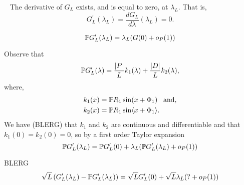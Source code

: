 \documentclass[journal]{IEEEtran}
\begin{document}
\begin{lemma}~\label{lem:diffatlambdaL}
The derivative of $G_L$ exists, and is equal to zero, at $\lambda_L$.  That is,
\[
G_L^\prime(\lambda_L) = \frac{d G_L}{d \lambda}(\lambda_L) = 0.
\]
\end{lemma}

\begin{lemma}\label{lem:GprimeLlambdaLconv}
\[
{\mathbb P} G^\prime_L(\lambda_L) = \lambda_L( G(0)  + o_P(1) )
\]
\end{lemma}
\begin{IEEEproof}
Observe that
\[
{\mathbb P} G^\prime_L(\lambda) = \frac{{\left| P \right|}}{L} k_1(\lambda) + \frac{{\left| D \right|}}{L} k_2(\lambda),
\]
where,
\begin{align*}
k_1(x) &= {\mathbb P} R_1 \sin(x + \Phi_1) \;\;\; \text{and}, \\
k_2(x) &=  {\mathbb P} R_1 \sin\langle x + \Phi_1 \rangle.
\end{align*}
We have (BLERG) that $k_1$ and $k_2$ are continuous and differentiable and that $k_1(0) = k_2(0) = 0$, so by a first order Taylor expansion
\[
{\mathbb P} G^\prime_L(\lambda_L) = {\mathbb P} G^\prime_L(0) + \lambda_L( {\mathbb P} G^\prime_L(\lambda_L)  + o_P(1) )
\]
\end{IEEEproof}

\begin{lemma}\label{lem:empiricprocc} BLERG
\[ 
\sqrt{L} \left( G_L^\prime(\lambda_L) - {\mathbb P} G_L^\prime(\lambda_L) \right) = \sqrt{L} G_L'(0) + \sqrt{L}\lambda_L( ? +  o_P(1) )
\]
\end{lemma}
\begin{IEEEproof}
\end{IEEEproof}

\end{document}

